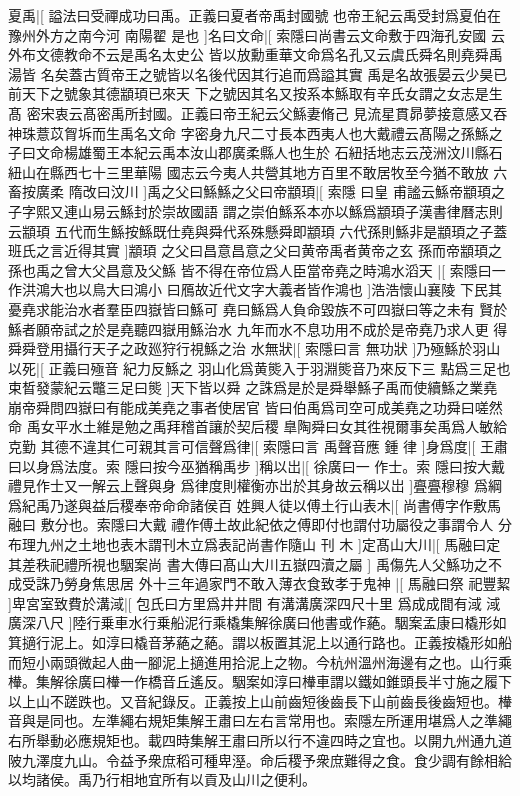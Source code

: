 夏禹|[%
謚法曰受禪成功曰禹。正義曰夏者帝禹封國號%
也帝王紀云禹受封爲夏伯在豫州外方之南今河%
%
南陽翟%
是也%
]名曰文命|[%
索隱曰尚書云文命敷于四海孔安國%
云外布文德教命不云是禹名太史公%
%
皆以放勳重華文命爲名孔又云虞氏舜名則堯舜禹湯皆%
名矣蓋古質帝王之號皆以名後代因其行追而爲謚其實%
%
禹是名故張晏云少昊已前天下之號象其德顓頊已來天%
下之號因其名又按系本鯀取有辛氏女謂之女志是生髙%
%
密宋衷云髙密禹所封國。正義曰帝王紀云父鯀妻脩己%
見流星貫昴夢接意感又吞神珠薏苡胷坼而生禹名文命%
%
字密身九尺二寸長本西夷人也大戴禮云髙陽之孫鯀之%
子曰文命楊雄蜀王本紀云禹本汝山郡廣柔縣人也生於%
%
石紐括地志云茂洲汶川縣石紐山在縣西七十三里華陽%
國志云今夷人共營其地方百里不敢居牧至今猶不敢放%
%
六畜按廣柔%
隋改曰汶川%
]禹之父曰鯀鯀之父曰帝顓頊|[%
索隱%
曰皇%
%
甫謐云鯀帝顓頊之子字熙又連山易云鯀封於崇故國語%
謂之崇伯鯀系本亦以鯀爲顓頊子漢書律曆志則云顓頊%
%
五代而生鯀按鯀既仕堯與舜代系殊懸舜即顓頊%
六代孫則鯀非是顓頊之子蓋班氏之言近得其實%
]顓頊%
之父曰昌意昌意之父曰黄帝禹者黄帝之玄%
孫而帝顓頊之孫也禹之曾大父昌意及父鯀%
皆不得在帝位爲人臣當帝堯之時鴻水滔天%
|[%
索隱曰一作洪鴻大也以鳥大曰鴻小%
曰鴈故近代文字大義者皆作鴻也%
]浩浩懷山襄陵%
下民其憂堯求能治水者羣臣四嶽皆曰鯀可%
堯曰鯀爲人負命毀族不可四嶽曰等之未有%
賢於鯀者願帝試之於是堯聽四嶽用鯀治水%
九年而水不息功用不成於是帝堯乃求人更%
得舜舜登用攝行天子之政廵狩行視鯀之治%
水無狀|[%
索隱曰言%
無功狀%
]乃殛鯀於羽山以死|[%
正義曰殛音%
紀力反鯀之%
%
羽山化爲黄熋入于羽淵熋音乃來反下三%
點爲三足也束晳發蒙紀云鼈三足曰熋%
]天下皆以舜%
之誅爲是於是舜舉鯀子禹而使續鯀之業堯%
崩帝舜問四嶽曰有能成美堯之事者使居官%
皆曰伯禹爲司空可成美堯之功舜曰嗟然命%
禹女平水土維是勉之禹拜稽首讓於契后稷%
臯陶舜曰女其徃視爾事矣禹爲人敏給克勤%
其德不違其仁可親其言可信聲爲律|[%
索隱曰言%
禹聲音應%
%
鍾%
律%
]身爲度|[%
王肅曰以身爲法度。索%
隱曰按今巫猶稱禹步%
]稱以岀|[%
徐廣曰一%
作士。索%
%
隱曰按大戴禮見作士又一解云上聲與身%
爲律度則權衡亦岀於其身故云稱以岀%
]亹亹穆穆%
爲綱爲紀禹乃遂與益后稷奉帝命命諸侯百%
姓興人徒以傅土行山表木|[%
尚書傅字作敷馬融曰%
敷分也。索隱曰大戴%
%
禮作傅土故此紀依之傅即付也謂付功屬役之事謂令人%
分布理九州之土地也表木謂刊木立爲表記尚書作隨山%
%
刊%
木%
]定髙山大川|[%
馬融曰定其差秩祀禮所視也駰案尚%
書大傳曰髙山大川五嶽四瀆之屬%
]%
禹傷先人父鯀功之不成受誅乃勞身焦思居%
外十三年過家門不敢入薄衣食致孝于鬼神%
|[%
馬融曰祭%
祀豐絜%
]卑宮室致費於溝淢|[%
包氏曰方里爲井井間%
有溝溝廣深四尺十里%
%
爲成成間有淢%
淢廣深八尺%
]陸行乗車水行乗船泥行乘橇集解徐廣曰他書或作蕝。駰案孟康曰橇形如箕擿行泥上。如淳曰橇音茅蕝之蕝。謂以板置其泥上以通行路也。正義按橇形如船而短小兩頭微起人曲一腳泥上擿進用拾泥上之物。今杭州溫州海邊有之也。山行乘檋。集解徐廣曰檋一作橋音丘遙反。駰案如淳曰檋車謂以鐵如錐頭長半寸施之履下以上山不蹉跌也。又音紀錄反。正義按上山前齒短後齒長下山前齒長後齒短也。檋音與是同也。左準繩右規矩集解王肅曰左右言常用也。索隱左所運用堪爲人之準繩右所舉動必應規矩也。載四時集解王肅曰所以行不違四時之宜也。以開九州通九道陂九澤度九山。令益予衆庶稻可種卑溼。命后稷予衆庶難得之食。食少調有餘相給以均諸侯。禹乃行相地宜所有以貢及山川之便利。

